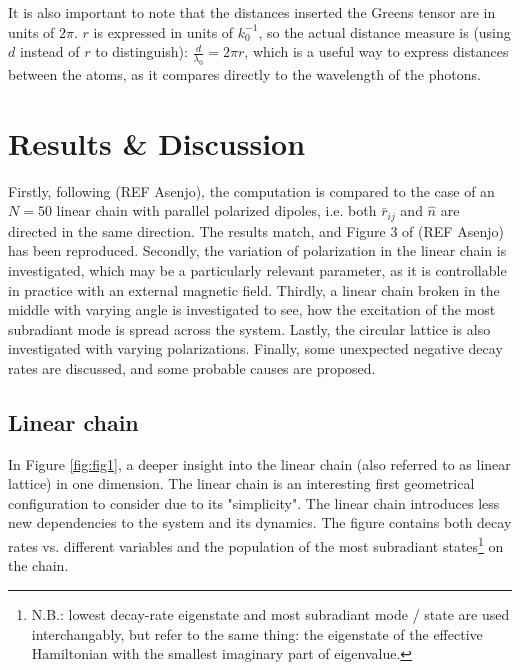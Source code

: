 \documentclass{article}
\begin{document}
It is also important to note that the distances inserted the Greens tensor are in units of $2\pi$. $r$ is expressed in units of $k_0^{-1}$, so the actual distance measure is (using $d$ instead of $r$ to distinguish): $\frac{d}{\lambda_0} = 2 \pi r$, which is a useful way to express distances between the atoms, as it compares directly to the wavelength of the photons. 

\section{Results \& Discussion}\label{sec:results}

Firstly, following (REF Asenjo), the computation is compared to the case of an $N=50$ linear chain with parallel polarized dipoles, i.e. both $\bar{r}_{ij}$ and $\hat{n}$ are directed in the same direction. The results match, and Figure 3 of (REF Asenjo) has been reproduced. Secondly, the variation of polarization in the linear chain is investigated, which may be a particularly relevant parameter, as it is controllable in practice with an external magnetic field. Thirdly, a linear chain broken in the middle with varying angle is investigated to see, how the excitation of the most subradiant mode is spread across the system. Lastly, the circular lattice is also investigated with varying polarizations. Finally, some unexpected negative decay rates are discussed, and some probable causes are proposed. 

\subsection{Linear chain}\label{disc:linear_chain}

In Figure \ref{fig:fig1}, a deeper insight into the linear chain (also referred to as linear lattice) in one dimension. The linear chain is an interesting first geometrical configuration to consider due to its "simplicity". The linear chain introduces less new dependencies to the system and its dynamics. The figure contains both decay rates vs. different variables and the population of the most subradiant states\footnote{N.B.: lowest decay-rate eigenstate and most subradiant mode / state are used interchangably, but refer to the same thing: the eigenstate of the effective Hamiltonian with the smallest imaginary part of eigenvalue.} on the chain. 
\end{document}
